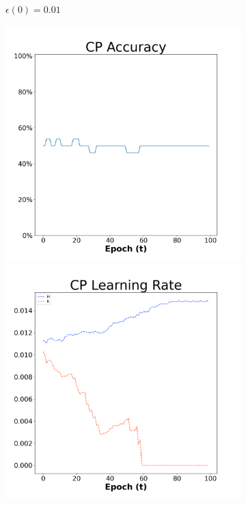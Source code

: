 \begin{figure}[H]
\begin{subfigure}{0.3\textwidth}
  \caption{$\epsilon(0)=0.01$}
\end{subfigure}\hfil %
\begin{subfigure}{0.3\textwidth}
  \includegraphics[width=\linewidth]{images/exper1/Sonar/CP_0.03_acc.png}
  \includegraphics[width=\linewidth]{images/exper1/Sonar/CP_0.03_lr.png}

\end{subfigure}
\end{figure}
